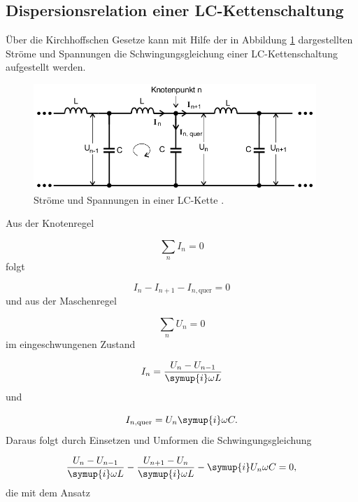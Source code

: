 \subsection{Dispersionsrelation einer LC-Kettenschaltung}

Über die Kirchhoffschen Gesetze kann mit Hilfe der in Abbildung
\ref{fig:KetteLC} dargestellten Ströme und Spannungen die Schwingungsgleichung
einer LC-Kettenschaltung aufgestellt werden.

\begin{figure}
  \centering
  \includegraphics[height=4cm]{KetteLC.png}
  \caption{Ströme und Spannungen in einer LC-Kette \cite{anleitung}.}
  \label{fig:KetteLC}
\end{figure}

Aus der Knotenregel

\begin{equation}
  \sum_{n} I_n = 0
  \label{eqn:Knoten}
\end{equation}
folgt

\begin{equation}
  I_n - I_{n+1} - I_{n,\text{quer}} = 0
\end{equation}
und aus der Maschenregel

\begin{equation}
  \sum_{n} U_n = 0
  \label{eqn:Masche}
\end{equation}
im eingeschwungenen Zustand

\begin{equation}
  I_{n} = \frac{U_{n} - U_{n-1}}{\symup{i} \omega L}
\end{equation}
und

\begin{equation}
  I_{n,\text{quer}} = U_{n} \symup{i} \omega C.
\end{equation}
Daraus folgt durch Einsetzen und Umformen die Schwingungsgleichung

\begin{equation}
  \frac{U_{n} - U_{n-1}}{\symup{i} \omega L} - \frac{U_{n+1} - U_{n}}{\symup{i}
  \omega L} - \symup{i} U_{n} \omega C = 0,
\end{equation}
die mit dem Ansatz

